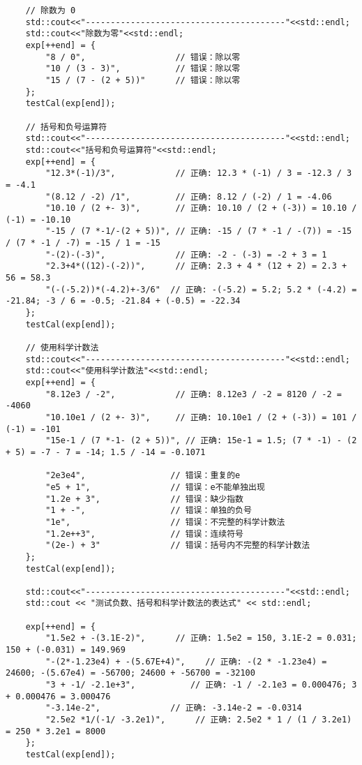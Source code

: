 \documentclass[UTF8]{ctexart}
\begin{document}
\begin{lstlisting}
    // 除数为 0
    std::cout<<"----------------------------------------"<<std::endl;
    std::cout<<"除数为零"<<std::endl;
    exp[++end] = { 
        "8 / 0",                  // 错误：除以零
        "10 / (3 - 3)",           // 错误：除以零
        "15 / (7 - (2 + 5))"      // 错误：除以零
    };
    testCal(exp[end]);

    // 括号和负号运算符
    std::cout<<"----------------------------------------"<<std::endl;
    std::cout<<"括号和负号运算符"<<std::endl;
    exp[++end] = {  
        "12.3*(-1)/3",            // 正确: 12.3 * (-1) / 3 = -12.3 / 3 = -4.1
        "(8.12 / -2) /1",         // 正确: 8.12 / (-2) / 1 = -4.06
        "10.10 / (2 +- 3)",       // 正确: 10.10 / (2 + (-3)) = 10.10 / (-1) = -10.10
        "-15 / (7 *-1/-(2 + 5))", // 正确: -15 / (7 * -1 / -(7)) = -15 / (7 * -1 / -7) = -15 / 1 = -15
        "-(2)-(-3)",              // 正确: -2 - (-3) = -2 + 3 = 1
        "2.3+4*((12)-(-2))",      // 正确: 2.3 + 4 * (12 + 2) = 2.3 + 56 = 58.3
        "(-(-5.2))*(-4.2)+-3/6"  // 正确: -(-5.2) = 5.2; 5.2 * (-4.2) = -21.84; -3 / 6 = -0.5; -21.84 + (-0.5) = -22.34
    };
    testCal(exp[end]);

    // 使用科学计数法
    std::cout<<"----------------------------------------"<<std::endl;
    std::cout<<"使用科学计数法"<<std::endl;
    exp[++end] = { 
        "8.12e3 / -2",            // 正确: 8.12e3 / -2 = 8120 / -2 = -4060
        "10.10e1 / (2 +- 3)",     // 正确: 10.10e1 / (2 + (-3)) = 101 / (-1) = -101
        "15e-1 / (7 *-1- (2 + 5))", // 正确: 15e-1 = 1.5; (7 * -1) - (2 + 5) = -7 - 7 = -14; 1.5 / -14 = -0.1071

        "2e3e4",                 // 错误：重复的e
        "e5 + 1",                // 错误：e不能单独出现
        "1.2e + 3",              // 错误：缺少指数
        "1 + -",                 // 错误：单独的负号
        "1e",                    // 错误：不完整的科学计数法
        "1.2e++3",               // 错误：连续符号
        "(2e-) + 3"              // 错误：括号内不完整的科学计数法
    };
    testCal(exp[end]);

    std::cout<<"----------------------------------------"<<std::endl;
    std::cout << "测试负数、括号和科学计数法的表达式" << std::endl;

    exp[++end] = {
        "1.5e2 + -(3.1E-2)",      // 正确: 1.5e2 = 150, 3.1E-2 = 0.031; 150 + (-0.031) = 149.969
        "-(2*-1.23e4) + -(5.67E+4)",    // 正确: -(2 * -1.23e4) = 24600; -(5.67e4) = -56700; 24600 + -56700 = -32100
        "3 + -1/ -2.1e+3",           // 正确: -1 / -2.1e3 = 0.000476; 3 + 0.000476 = 3.000476
        "-3.14e-2",              // 正确: -3.14e-2 = -0.0314
        "2.5e2 *1/(-1/ -3.2e1)",      // 正确: 2.5e2 * 1 / (1 / 3.2e1) = 250 * 3.2e1 = 8000
    };
    testCal(exp[end]);


\end{lstlisting}
\end{document}

